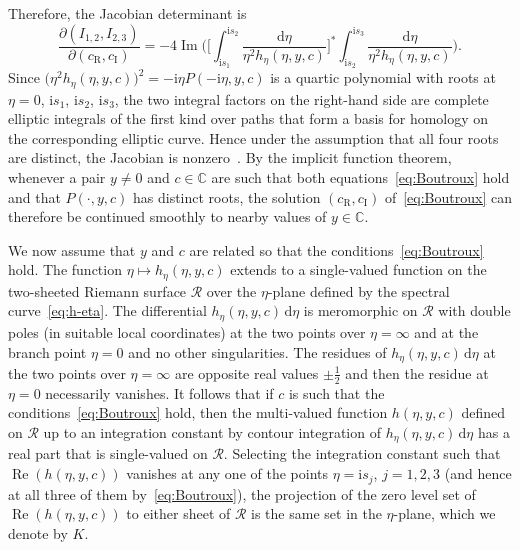 \documentclass[11pt]{article}
\numberwithin{equation}{section}
\numberwithin{equation}{section}
\begin{document}
Therefore, the Jacobian determinant is
\begin{equation*}
\frac{\partial (I_{1,2},I_{2,3})}{\partial (c_\mathrm{R},c_\mathrm{I})}
= -4\operatorname{Im}\bigg(\bigg[\int_{\mathrm{i} s_1}^{\mathrm{i} s_2}\frac{\mathrm{d}\eta}{\eta^2h_\eta(\eta,y,c)}\bigg]^*
\int_{\mathrm{i} s_2}^{\mathrm{i} s_3}\frac{\mathrm{d}\eta}{\eta^2h_\eta(\eta,y,c)}\bigg).
\end{equation*}
Since $\bigl(\eta^2h_\eta(\eta,y,c)\bigr)^2 = -\mathrm{i}\eta P(-\mathrm{i}\eta,y,c)$ is a quartic polynomial with roots at $\eta=0$, $\mathrm{i} s_1$, $\mathrm{i} s_2$, $\mathrm{i} s_3$, the two integral factors on the right-hand side are complete elliptic integrals of the first kind over paths that form a basis for homology on the corresponding elliptic curve. Hence under the assumption that all four roots are distinct, the Jacobian is nonzero~\cite[Corollary 1]{Dubrovin81}. By the implicit function theorem, whenever a pair $y\neq 0$ and $c\in\mathbb{C}$ are such that both equations~\eqref{eq:Boutroux} hold and that $P(\cdot,y,c)$ has distinct roots, the solution $(c_\mathrm{R},c_\mathrm{I})$ of~\eqref{eq:Boutroux} can therefore be continued smoothly to nearby values of $y\in\mathbb{C}$.

We now assume that $y$ and $c$ are related so that the conditions~\eqref{eq:Boutroux} hold. The function $\eta\mapsto h_\eta(\eta,y,c)$ extends to a single-valued function on the two-sheeted Riemann surface $\mathcal{R}$ over the $\eta$-plane defined by the spectral curve~\eqref{eq:h-eta}. The differential $h_\eta(\eta,y,c)\,\mathrm{d}\eta$ is meromorphic on $\mathcal{R}$ with double poles (in suitable local coordinates) at the two points over $\eta=\infty$ and at the branch point $\eta=0$ and no other singularities. The residues of $h_\eta(\eta,y,c)\,\mathrm{d}\eta$ at the two points over $\eta=\infty$ are opposite real values $\pm\frac{1}{2}$ and then the residue at $\eta=0$ necessarily vanishes. It follows that if $c$ is such that the conditions~\eqref{eq:Boutroux} hold, then the multi-valued function $h(\eta,y,c)$ defined on $\mathcal{R}$ up to an integration constant by contour integration of $h_\eta(\eta,y,c)\,\mathrm{d}\eta$ has a real part that is single-valued on $\mathcal{R}$. Selecting the integration constant such that $\operatorname{Re}(h(\eta,y,c))$ vanishes at any one of the points $\eta=\mathrm{i} s_j$, $j=1,2,3$ (and hence at all three of them by~\eqref{eq:Boutroux}), the projection of the zero level set of $\operatorname{Re}(h(\eta,y,c))$ to either sheet of $\mathcal{R}$ is the same set in the $\eta$-plane, which we denote by $K$.
\end{document}
